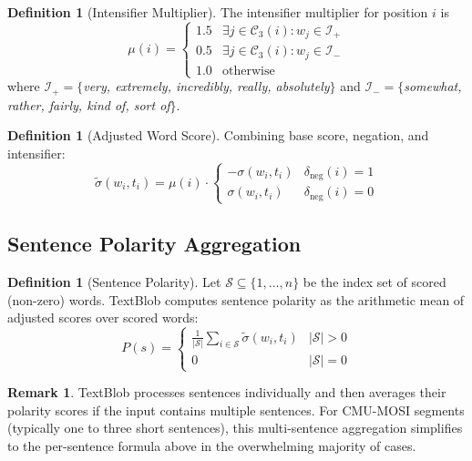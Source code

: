 \documentclass[12pt,a4paper]{article}
\theoremstyle{plain}
\theoremstyle{definition}
\newtheorem{definition}[theorem]{Definition}
\newtheorem{remark}[theorem]{Remark}
\begin{document}
\begin{definition}[Intensifier Multiplier]
\label{def:intensifier}
  The intensifier multiplier for position $i$ is
  \[
    \mu(i) =
    \begin{cases}
      1.5  & \exists j \in \mathcal{C}_3(i): w_j \in \mathcal{I}_+ \\
      0.5  & \exists j \in \mathcal{C}_3(i): w_j \in \mathcal{I}_- \\
      1.0  & \text{otherwise}
    \end{cases}
  \]
  where $\mathcal{I}_+ = \{$\textit{very, extremely, incredibly,
  really, absolutely}$\}$ and $\mathcal{I}_- = \{$\textit{somewhat,
  rather, fairly, kind of, sort of}$\}$.
\end{definition}

\begin{definition}[Adjusted Word Score]
\label{def:adjusted}
  Combining base score, negation, and intensifier:
  \[
    \tilde{\sigma}(w_i, t_i) =
    \mu(i) \cdot
    \begin{cases}
      -\sigma(w_i, t_i) & \delta_{\text{neg}}(i) = 1 \\
       \sigma(w_i, t_i) & \delta_{\text{neg}}(i) = 0
    \end{cases}
  \]
\end{definition}

\subsection{Sentence Polarity Aggregation}

\begin{definition}[Sentence Polarity]
\label{def:sentpol}
  Let $\mathcal{S} \subseteq \{1,\ldots,n\}$ be the index set of
  scored (non-zero) words.  TextBlob computes sentence polarity as
  the arithmetic mean of adjusted scores over scored words:
  \[
    P(s) =
    \begin{cases}
      \displaystyle
      \frac{1}{|\mathcal{S}|}
        \sum_{i \in \mathcal{S}} \tilde{\sigma}(w_i, t_i)
        & |\mathcal{S}| > 0 \\[8pt]
      0 & |\mathcal{S}| = 0
    \end{cases}
  \]
\end{definition}

\begin{remark}
  TextBlob processes sentences individually and then averages their
  polarity scores if the input contains multiple sentences.  For
  CMU-MOSI segments (typically one to three short sentences), this
  multi-sentence aggregation simplifies to the per-sentence formula
  above in the overwhelming majority of cases.
\end{remark}
\end{document}
